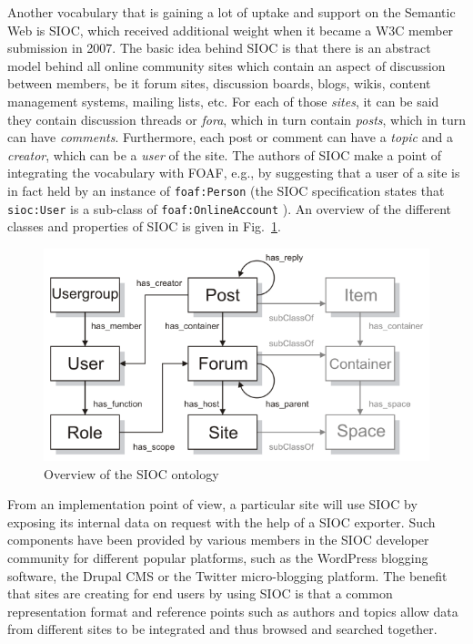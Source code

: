 \documentclass{article}
\begin{document}
Another vocabulary that is gaining a lot of uptake and support on the Semantic Web is SIOC, which received additional weight when it became a W3C member submission in 2007. The basic idea behind SIOC is that there is an abstract model behind all online community sites which contain an aspect of discussion between members, be it forum sites, discussion boards, blogs, wikis, content management systems, mailing lists, etc. For each of those \emph{sites}, it can be said they contain discussion threads or \emph{fora}, which in turn contain \emph{posts}, which in turn can have \emph{comments}. Furthermore, each post or comment can have a \emph{topic} and a \emph{creator}, which can be a \emph{user} of the site. The authors of SIOC make a point of integrating the vocabulary with FOAF, e.g., by suggesting that a user of a site is in fact held by an instance of \texttt{foaf:Person} (the SIOC specification states that \texttt{sioc:User} is a sub-class of \texttt{foaf:OnlineAccount} \cite{sioc_spec2009}). An overview of the different classes and properties of SIOC is given in Fig.~\ref{fig:sioc_overview}.

\begin{figure}
  \begin{center}
    \includegraphics[width=0.8\linewidth]{images/sioc_overview}
    \caption{Overview of the SIOC ontology}
    \label{fig:sioc_overview}
  \end{center}
\end{figure}

From an implementation point of view, a particular site will use SIOC by exposing its internal data on request with the help of a SIOC exporter. Such components have been provided by various members in the SIOC developer community for different popular platforms, such as the WordPress blogging software, the Drupal CMS or the Twitter micro-blogging platform. The benefit that sites are creating for end users by using SIOC is that a common representation format and reference points such as authors and topics allow data from different sites to be integrated and thus browsed and searched together.
\end{document}

